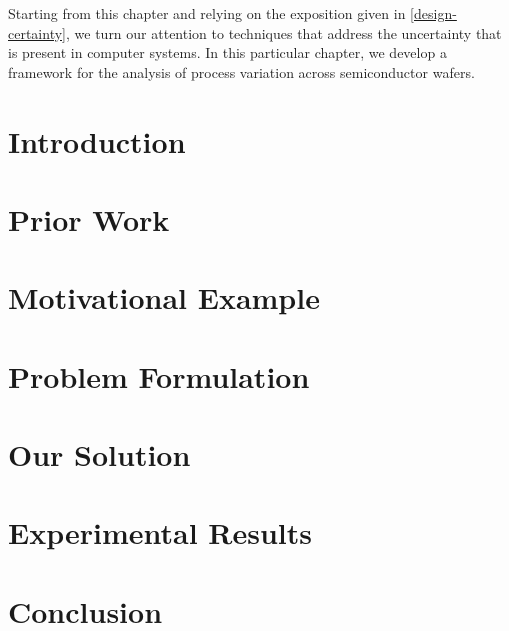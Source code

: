 Starting from this chapter and relying on the exposition given in
\cref{design-certainty}, we turn our attention to techniques that address the
uncertainty that is present in computer systems. In this particular chapter, we
develop a framework for the analysis of process variation across semiconductor
wafers.

\section{Introduction}

\section{Prior Work}

\section{Motivational Example}

\section{Problem Formulation}

\section{Our Solution}

\section{Experimental Results}

\section{Conclusion}
